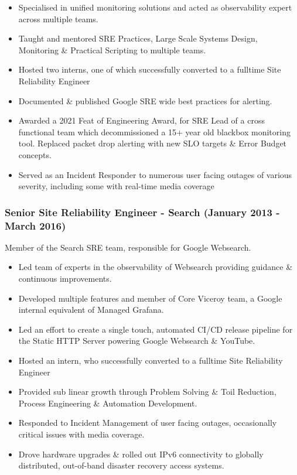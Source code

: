 \documentclass[a4paper, 10pt] {article}
\begin{document}
\begin{itemize}[noitemsep]
	\item Specialised in unified monitoring solutions and acted as observability expert across multiple teams.
	\item Taught and mentored SRE Practices, Large Scale Systems Design, Monitoring \& Practical Scripting to multiple teams.
 	\item Hosted two interns, one of which successfully converted to a fulltime Site Reliability Engineer
	\item Documented \& published Google SRE wide best practices for alerting.
	\item Awarded a 2021 Feat of Engineering Award, for SRE Lead of a cross functional team which decommissioned a 15+ year old blackbox
		monitoring tool. Replaced packet drop alerting with new SLO targets \& Error Budget concepts.
	\item Served as an Incident Responder to numerous user facing outages of various severity, including some with real-time media coverage
\end{itemize}

\subsubsection*{Senior Site Reliability Engineer - Search (January 2013 - March 2016)}

Member of the Search SRE team, responsible for Google Websearch.

\begin{itemize}[noitemsep]
	\item Led team of experts in the observability of Websearch providing guidance \& continuous improvements.
	\item Developed multiple features and member of Core Viceroy team, a Google internal equivalent of Managed Grafana.
  	\item Led an effort to create a single touch, automated CI/CD release pipeline for the Static HTTP Server powering Google Websearch \& YouTube.
   	\item Hosted an intern, who successfully converted to a fulltime Site Reliability Engineer
	\item Provided sub linear growth through Problem Solving \& Toil Reduction, Process Engineering \& Automation Development.
	\item Responded to Incident Management of user facing outages, occasionally critical issues with media coverage.
 	\item Drove hardware upgrades \& rolled out IPv6 connectivity to globally distributed, out-of-band disaster recovery access systems.
\end{itemize}
\end{document}
